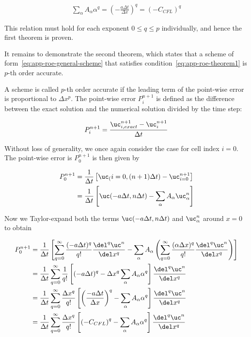 \begin{align}
\sum_\alpha A_\alpha \alpha^q = \left( - \frac{a \Delta t}{\Delta x}\right)^q = (- C_{CFL})^q
\end{align}

This relation must hold for each exponent $0 \leq q \leq p$ individually, and hence the first
theorem is proven.


It remains to demonstrate the second theorem, which states that a scheme of
form~\ref{eq:app-roe-general-scheme} that satisfies condition~\ref{eq:app-roe-theorem1} is $p$-th
order accurate.

A scheme is called $p$-th order accurate if the leading term of the point-wise error is proportional
to $\Delta x^p$. The point-wise error $P_i^{n+1}$ is defined as the difference between the exact
solution and the numerical solution divided by the time step:

\begin{align}
 P_i^{n+1} = \frac{\uc_{i,exact}^{n+1} - \uc_i^{n+1}}{\Delta t}
\end{align}

Without loss of generality, we once again consider the case for cell index $i = 0$. The point-wise
error is $P_0^{n+1}$ is then given by

\begin{align}
P_0^{n+1}
&= \frac{1}{\Delta t} \left[
    \uc_(i=0, (n+1) \Delta t) - \uc_{i=0}^{n+1}
    \right] \\
&= \frac{1}{\Delta t} \left[
    \uc(-a\Delta t, n \Delta t) - \sum_\alpha A_\alpha \uc_\alpha^n
    \right]
\end{align}

Now we Taylor-expand both the terms $\uc(-a \Delta t, n \Delta t)$ and $\uc_\alpha^n$ around $x =
0$ to obtain


\begin{align}
P_0^{n+1}
&= \frac{1}{\Delta t} \left[
    \sum_{q = 0}^\infty \frac{(-a \Delta t)^q}{q!} \frac{\del^q \uc^n}{\del x^q} -
    \sum_\alpha A_\alpha
        \left( \sum_{q=0}^\infty \frac{(\alpha \Delta x)^q}{q!} \frac{\del^q \uc^n}{\del x^q}
\right)
    \right] \\
&= \frac{1}{\Delta t} \sum_{q = 0}^\infty  \frac{1}{q!} \left[
    (-a \Delta t)^q - \Delta x^q \sum_\alpha A_\alpha \alpha^q
    \right] \frac{\del^q \uc^n}{\del x^q}  \\
&= \frac{1}{\Delta t} \sum_{q = 0}^\infty  \frac{\Delta x^q}{q!} \left[
    \left(\frac{-a \Delta t}{\Delta x} \right)^q - \sum_\alpha A_\alpha \alpha^q
    \right] \frac{\del^q \uc^n}{\del x^q} \\
&= \frac{1}{\Delta t} \sum_{q = 0}^\infty  \frac{\Delta x^q}{q!} \left[
    \left(- C_{CFL} \right)^q - \sum_\alpha A_\alpha \alpha^q
    \right] \frac{\del^q \uc^n}{\del x^q}
\end{align}

